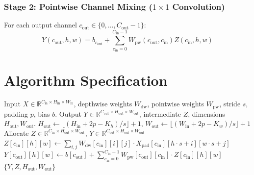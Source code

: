 \documentclass[11pt,a4paper]{article}
\theoremstyle{definition}
\begin{document}
\subsubsection{Stage 2: Pointwise Channel Mixing ($1 \times 1$ Convolution)}
For each output channel $c_{\text{out}} \in \{0, \dots, C_{\text{out}}-1\}$:
\begin{equation}
Y(c_{\text{out}}, h, w) = b_{c_{\text{out}}} + \sum_{c_{\text{in}}=0}^{C_{\text{in}}-1} W_{\text{pw}}(c_{\text{out}}, c_{\text{in}}) Z(c_{\text{in}}, h, w)
\end{equation}

\section{Algorithm Specification}

\begin{algorithm}[H]
\caption{Depthwise Separable 2D Convolution Forward Pass}
\label{alg:depthwise_separable}
\begin{algorithmic}[1]
\Require Input $X \in \mathbb{R}^{C_{\text{in}} \times H_{\text{in}} \times W_{\text{in}}}$, depthwise weights $W_{\text{dw}}$, pointwise weights $W_{\text{pw}}$, stride $s$, padding $p$, bias $b$.
\Ensure Output $Y \in \mathbb{R}^{C_{\text{out}} \times H_{\text{out}} \times W_{\text{out}}}$, intermediate $Z$, dimensions $H_{\text{out}}, W_{\text{out}}$.
\State $H_{\text{out}} \gets \lfloor (H_{\text{in}} + 2p - K_h) / s \rfloor + 1$, $W_{\text{out}} \gets \lfloor (W_{\text{in}} + 2p - K_w) / s \rfloor + 1$
\State Allocate $Z \in \mathbb{R}^{C_{\text{in}} \times H_{\text{out}} \times W_{\text{out}}}$, $Y \in \mathbb{R}^{C_{\text{out}} \times H_{\text{out}} \times W_{\text{out}}}$
            \State $Z[c_{\text{in}}][h][w] \gets \sum_{i, j} W_{\text{dw}}[c_{\text{in}}][i][j] \cdot X_{\text{pad}}[c_{\text{in}}][h \cdot s + i][w \cdot s + j]$
        \EndFor
    \EndFor
\EndFor
{}
            \State $Y[c_{\text{out}}][h][w] \gets b[c_{\text{out}}] + \sum_{c_{\text{in}}=0}^{C_{\text{in}}-1} W_{\text{pw}}[c_{\text{out}}][c_{\text{in}}] \cdot Z[c_{\text{in}}][h][w]$
        \EndFor
    \EndFor
\EndFor
\State \Return $\{Y, Z, H_{\text{out}}, W_{\text{out}}\}$
\end{algorithmic}
\end{algorithm}
\end{document}
